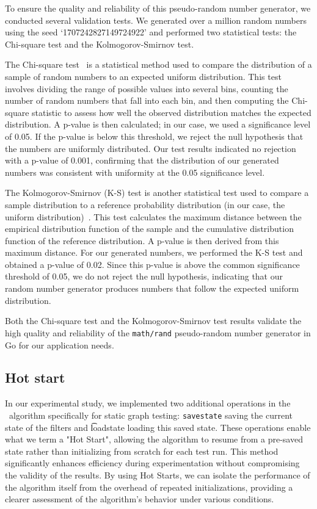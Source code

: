    To ensure the quality and reliability of this pseudo-random number generator, we conducted several validation tests. We generated over a million random numbers using the seed `1707242827149724922' and performed two statistical tests: the Chi-square test and the Kolmogorov-Smirnov test.
    
    The Chi-square test~\cite{MacLaren1965,Knuth_1997} is a statistical method used to compare the distribution of a sample of random numbers to an expected uniform distribution. This test involves dividing the range of possible values into several bins, counting the number of random numbers that fall into each bin, and then computing the Chi-square statistic to assess how well the observed distribution matches the expected distribution. A p-value is then calculated; in our case, we used a significance level of 0.05. If the p-value is below this threshold, we reject the null hypothesis that the numbers are uniformly distributed. Our test results indicated no rejection with a p-value of 0.001, confirming that the distribution of our generated numbers was consistent with uniformity at the 0.05 significance level.
    
    The Kolmogorov-Smirnov (K-S) test is another statistical test used to compare a sample distribution to a reference probability distribution (in our case, the uniform distribution)~\cite{Massey1951,Knuth_1997}. This test calculates the maximum distance between the empirical distribution function of the sample and the cumulative distribution function of the reference distribution. A p-value is then derived from this maximum distance. For our generated numbers, we performed the K-S test and obtained a p-value of 0.02. Since this p-value is above the common significance threshold of 0.05, we do not reject the null hypothesis, indicating that our random number generator produces numbers that follow the expected uniform distribution.
    
    Both the Chi-square test and the Kolmogorov-Smirnov test results validate the high quality and reliability of the \verb|math/rand| pseudo-random number generator in Go for our application needs.

    \subsection*{Hot start}
    In our experimental study, we implemented two additional operations in the \DPmst\ algorithm specifically for static graph testing: {\tt savestate} saving the current state of the filters and {\t loadstate} loading this saved state. These operations enable what we term a "Hot Start", allowing the algorithm to resume from a pre-saved state rather than initializing from scratch for each test run. This method significantly enhances efficiency during experimentation without compromising the validity of the results. By using Hot Starts, we can isolate the performance of the algorithm itself from the overhead of repeated initializations, providing a clearer assessment of the algorithm's behavior under various conditions.

